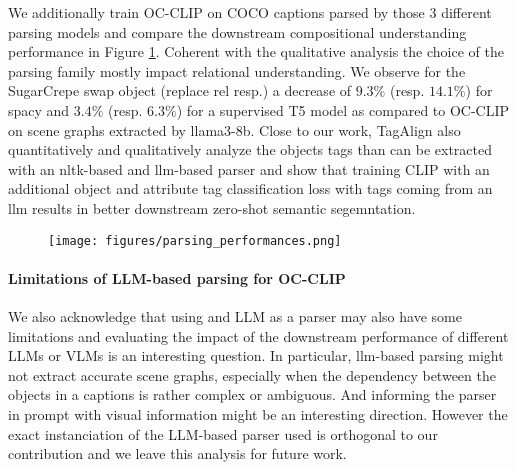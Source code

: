 {\begin{table}[htbp]
  \caption{}
  \label{tab:parsing-errors}
\end{table}

We additionally train OC-CLIP on COCO captions parsed by those 3 different parsing models and compare the downstream compositional understanding performance in Figure \ref{fig:parsing-perf}. Coherent with the qualitative analysis the choice of the parsing family mostly impact relational understanding. We observe for the SugarCrepe swap object (replace rel resp.)  a decrease of $9.3\%$ (resp. $14.1\%$) for spacy and $3.4\%$ (resp. $6.3\%$) for a supervised T5 model  as compared to OC-CLIP on scene graphs extracted by llama3-8b. 
Close to our work, TagAlign\citep{liu2024tagalignimprovingvisionlanguagealignment} also quantitatively and qualitatively analyze the objects tags than can be extracted with an nltk-based and llm-based parser and show that training CLIP with an additional object and attribute tag classification loss with tags coming from an llm results in better downstream zero-shot semantic segemntation.
\begin{figure}
    \centering
    \texttt{[image: figures/parsing\_performances.png]}
    \caption{}
    \label{fig:parsing-perf}
\end{figure}



\paragraph{Limitations of LLM-based parsing for OC-CLIP}
We also acknowledge that using and LLM as a parser may also have some limitations and evaluating the impact of the downstream performance of different LLMs or VLMs is an interesting question. In particular, llm-based parsing might not extract accurate scene graphs, especially when the dependency between the objects in a captions is rather complex or ambiguous. And informing the parser in prompt with visual information might be an interesting direction. However the exact instanciation of the LLM-based parser used is orthogonal to our contribution and we leave this analysis for future work.


}
